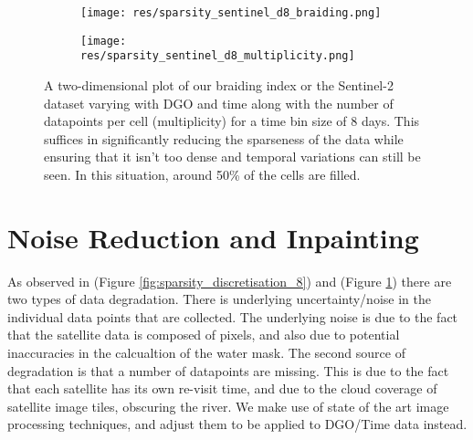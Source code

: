 \documentclass[12pt]{article}
\begin{document}
\begin{figure}[H]
    \centering
    \begin{subfigure}[t]{0.9\textwidth}
        \centering
        \texttt{[image: res/sparsity\_sentinel\_d8\_braiding.png]}
    \end{subfigure}
    \begin{subfigure}[t]{0.9\textwidth}
        \centering
        \texttt{[image: res/sparsity\_sentinel\_d8\_multiplicity.png]}
    \end{subfigure}
    \caption{A two-dimensional plot of our braiding index or the Sentinel-2 dataset varying with DGO and time along with the number of datapoints per cell (multiplicity) for a time bin size of 8 days. This suffices in significantly reducing the sparseness of the data while ensuring that it isn't too dense and temporal variations can still be seen. In this situation, around 50\% of the cells are filled.}
    \label{fig:sentinel_sparsity_discretisation_8}
\end{figure}






\section{Noise Reduction and Inpainting}
As observed in (Figure \ref{fig:sparsity_discretisation_8}) and (Figure \ref{fig:sentinel_sparsity_discretisation_8}) there are two types of data degradation. There is underlying uncertainty/noise in the individual data points that are collected. The underlying noise is due to the fact that the satellite data is composed of pixels, and also due to potential inaccuracies in the calcualtion of the water mask. The second source of degradation is that a number of datapoints are missing. This is due to the fact that each satellite has its own re-visit time, and due to the cloud coverage of satellite image tiles, obscuring the river. We make use of state of the art image processing techniques, and adjust them to be applied to DGO/Time data instead.
\end{document}
